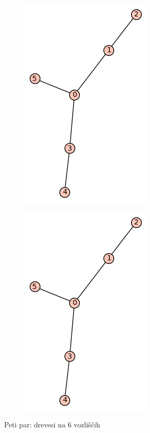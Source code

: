 \documentclass[12pt, a4paper]{article}
\begin{document}
\begin{center}
\begin{figure}[!htb]
\centering
\begin{subfigure}{0.5\textwidth}
  \centering
  \includegraphics[width=0.35\linewidth]{t-11}
\end{subfigure}%
\begin{subfigure}{0.5\textwidth}
  \centering
  \includegraphics[width=0.35\linewidth]{t-11}
\end{subfigure}
\caption{Peti par: drevesi na 6 vozliščih}
\label{fig:test}
\end{figure}
\end{center}
\end{document}
